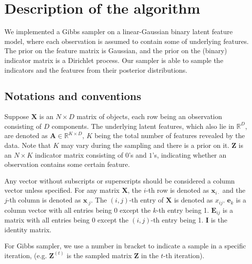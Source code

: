 \documentclass{article}
\begin{document}
\section{Description of the algorithm}\label{sec::description}

We implemented a Gibbs sampler on a linear-Gaussian binary latent feature model, where each observation is assumed to contain some of underlying features. The prior on the feature matrix is Gaussian, and the prior on the (binary) indicator matrix is a Dirichlet process. Our sampler is able to sample the indicators and the features from their posterior distributions.

\subsection{Notations and conventions}

Suppose $\mathbf{X}$ is an $N\times D$ matrix of objects, each row being an observation consisting of $D$ components. The underlying latent features, which also lie in $\mathbb{R}^D$, are denoted as $\mathbf{A} \in \mathbb{R}^{K\times D}$, $K$ being the total number of features revealed by the data. Note that $K$ may vary during the sampling and there is a prior on it. $\mathbf{Z}$ is an $N\times K$ indicator matrix consisting of $0$'s and $1$'s, indicating whether an observation contains some certain feature.

Any vector without subscripts or superscripts should be considered a column vector unless specified. For any matrix $\mathbf{X}$, the $i$-th row is denoted as $\boldsymbol{x}_{i\cdot}$ and the $j$-th column is denoted as $\boldsymbol{x}_{\cdot j}$. The $(i,j)$-th entry of $\mathbf{X}$ is denoted as $x_{ij}$. $\boldsymbol{e}_k$ is a column vector with all entries being 0 except the $k$-th entry being 1. $\mathbf{E}_{ij}$ is a matrix with all entries  being 0 except the $(i,j)$-th entry being 1. $\mathbf{I}$ is the identity matrix.

For Gibbs sampler, we use a number in bracket to indicate a sample in a specific iteration, (e.g. $\mathbf{Z}^{(t)}$ is the sampled matrix $\mathbf{Z}$ in the $t$-th iteration).
\end{document}
